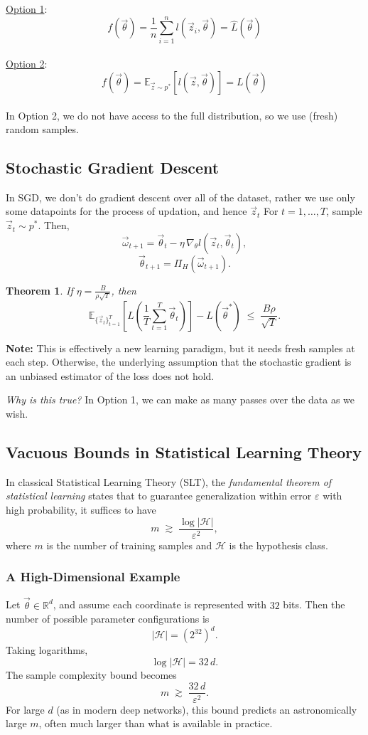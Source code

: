\documentclass[11pt]{article}
\theoremstyle{plain}
\newtheorem{theorem}{Theorem}[section]
\begin{document}
\underline{Option 1}:
\[
f(\vec{\theta}) = \frac{1}{n} \sum_{i=1}^{n} l(\vec{z}_i, \vec{\theta}) = \hat{L}(\vec{\theta})
\]
\\
\underline{Option 2}:
\[
f(\vec{\theta}) = \mathbb{E}_{\vec{z} \sim p^*} \left[ l(\vec{z}, \vec{\theta}) \right] = L(\vec{\theta})
\]\\

In Option 2, we do not have access to the full distribution, so we use (fresh) random samples.

\subsection{Stochastic Gradient Descent}
In SGD, we don't do gradient descent over all of the dataset, rather we use only some datapoints for the process of updation, and hence $\vec{z}_t$
For $t = 1, \dots, T$, sample $\vec{z}_t \sim p^*$.  
Then,
\[
\vec{\omega}_{t+1} = \vec{\theta}_t - \eta \, \nabla_\theta l(\vec{z}_t, \vec{\theta}_t),
\]
\[
\vec{\theta}_{t+1} = \Pi_H(\vec{\omega}_{t+1}).
\]

\begin{theorem}
If $\eta = \frac{B}{\rho \sqrt{T}}$, then
\[
\mathbb{E}_{\{\vec{z}_t\}_{t=1}^T} \left[ L\!\left( \frac{1}{T} \sum_{t=1}^T \vec{\theta}_t \right) \right]
- L(\vec{\theta}^*)
\;\le\; \frac{B\rho}{\sqrt{T}}.
\]
\end{theorem}

\noindent\textbf{Note:} This is effectively a new learning paradigm, but it needs fresh samples at each step.  
Otherwise, the underlying assumption that the stochastic gradient is an unbiased estimator of the loss does not hold.

\medskip
\noindent\textit{Why is this true?}  
In Option 1, we can make as many passes over the data as we wish.

\subsection{Vacuous Bounds in Statistical Learning Theory}

In classical Statistical Learning Theory (SLT), the \textit{fundamental theorem of statistical learning} states that to guarantee generalization within error $\varepsilon$ with high probability, it suffices to have
\[
m \;\gtrsim\; \frac{\log |\mathcal{H}|}{\varepsilon^2},
\]
where $m$ is the number of training samples and $\mathcal{H}$ is the hypothesis class.

\subsubsection*{A High-Dimensional Example}
Let $\vec{\theta} \in \mathbb{R}^d$, and assume each coordinate is represented with $32$ bits. Then the number of possible parameter configurations is
\[
|\mathcal{H}| = \left( 2^{32} \right)^{d}.
\]
Taking logarithms,
\[
\log |\mathcal{H}| = 32\,d.
\]
The sample complexity bound becomes
\[
m \;\gtrsim\; \frac{32\,d}{\varepsilon^2}.
\]
For large $d$ (as in modern deep networks), this bound predicts an astronomically large $m$, often much larger than what is available in practice.
\end{document}

